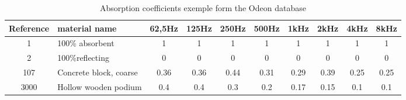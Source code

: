 \documentclass[AMA,STIX1COL]{WileyNJD-v2}
\begin{document}
 







%
%


\appendix

\begin{table}[h]
\centering
	\begin{tabular}{| c | m{2.5cm} | *{8}{c|}}
		\hline
		Reference & material name & 62,5Hz & 125Hz & 250Hz & 500Hz & 1kHz & 2kHz & 4kHz & 8kHz \\
		  \hline
		  \hline
		   1 & 100\% absorbent & 1 & 1 & 1 & 1 & 1 & 1 & 1 & 1 \\
		   \hline
		2 & 100\%reflecting & 0 & 0 & 0 & 0 & 0 & 0 & 0 & 0 \\
		   \hline
		107 & Concrete block, coarse & 0.36 & 0.36 & 0.44 & 0.31 & 0.29 & 0.39 & 0.25 & 0.25 \\
		   \hline
		3000 & Hollow wooden podium & 0.4 & 0.4 & 0.3 & 0.2 & 0.17 & 0.15 & 0.1 & 0.1 \\
	     \hline
	 \end{tabular}
	\caption{Absorption coefficients exemple form the Odeon database}
	\label{exempleOdeon}
\end{table}

\end{document}
